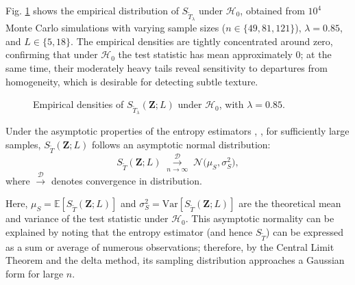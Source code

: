 \documentclass[
  lettersize  journal,
]{IEEEtran}%
\begin{document}
Fig. \ref{fig-densities-tsallis4} shows the empirical distribution of
\(S_{\widetilde{T}_{\lambda}}\) under \(\mathcal{H}_0\), obtained from
\(10^4\) Monte Carlo simulations with varying sample sizes
(\(n \in \{49,81,121\}\)), \(\lambda = 0.85\), and \(L \in \{5,18\}\).
The empirical densities are tightly concentrated around zero, confirming
that under \(\mathcal{H}_0\) the test statistic has mean approximately
\(0\); at the same time, their moderately heavy tails reveal sensitivity
to departures from homogeneity, which is desirable for detecting subtle
texture.

\begin{figure}[H]


\caption{\label{fig-densities-tsallis4}Empirical densities of
\(S_{\widetilde{T}_{\lambda}}(\bm{Z}; L)\) under \(\mathcal{H}_0\), with
\(\lambda=0.85\).}

\end{figure}%

Under the asymptotic properties of the entropy estimators
,
, for sufficiently large samples,
\(S_{\widetilde{T}}(\bm{Z};L)\) follows an asymptotic normal
distribution: \[
  S_{\widetilde{T}}(\mathbf Z;L)\;
  \overset{\mathcal{D}}{\underset{n \to \infty}{\longrightarrow}}\;
  \mathcal N\!\bigl(\mu_S,\sigma_S^{2}\bigr),
\] where \(\xrightarrow{\mathcal{D}}\) denotes convergence in
distribution.

Here, \(\mu_S = \mathbb{E}[S_{\widetilde{T}}(\bm{Z};L)]\) and
\(\sigma^2_S = \mathrm{Var}[S_{\widetilde{T}}(\bm{Z};L)]\) are the
theoretical mean and variance of the test statistic under
\(\mathcal{H}_0\). This asymptotic normality can be explained by noting
that the entropy estimator (and hence \(S_{\widetilde{T}}\)) can be
expressed as a sum or average of numerous observations; therefore, by
the Central Limit Theorem and the delta method, its sampling
distribution approaches a Gaussian form for large \(n\).
\end{document}
